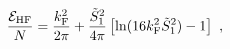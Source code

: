 \begin{equation}
\frac{{\cal E}_{\rm HF}}{N} = \frac{k_{\rm F}^2}{2\pi} + \frac{\tilde{S}_1^2}{4\pi}
\left[ \ln(16 k_{\rm F}^2 \tilde{S}_1^2) -1 \right] \ ,
\label{d16}
\end{equation}

